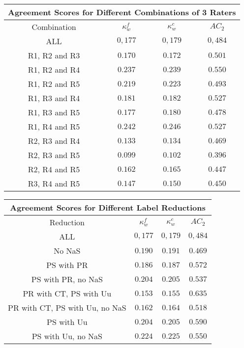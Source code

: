 \begin{minipage}{\linewidth}
\begin{tabular}{|c|c|c|c|}
\hline
\multicolumn{4}{|c|}{Agreement Scores for Different Combinations of 3 Raters}\\\hline
Combination &  $\kappa^{f}_{w}$ & $\kappa^{c}_{w}$ & $AC_2$\\\hline
ALL & $0,177$ & $0,179$ & $0,484$\\\hline
R1, R2 and R3 & $0.170$ & $0.172$ & $0.501$\\\hline
R1, R2 and R4 & $0.237$ & $0.239$ & $0.550$\\\hline
R1, R2 and R5 & $0.219$ & $0.223$ & $0.493$ \\\hline
R1, R3 and R4 & $0.181$ & $0.182$ & $0.527$ \\\hline
R1, R3 and R5 & $0.177$ & $0.180$ & $0.478$ \\\hline
R1, R4 and R5 & $0.242$ & $0.246$ & $0.527$ \\\hline
R2, R3 and R4 & $0.133$ & $0.134$ & $0.469$ \\\hline
R2, R3 and R5 & $0.099$ & $0.102$ & $0.396$ \\\hline
R2, R4 and R5 & $0.162$ & $0.165$ & $0.447$ \\\hline
R3, R4 and R5 & $0.147$ & $0.150$ & $0.450$\\\hline  
\end{tabular}
\end{minipage}
\newline
\newline
\newline
\begin{minipage}{\linewidth}
\begin{tabular}{|c|c|c|c|}
\hline
\multicolumn{4}{|c|}{Agreement Scores for Different Label Reductions}\\\hline
Reduction &  $\kappa^{f}_{w}$ & $\kappa^{c}_{w}$ & $AC_2$\\\hline
ALL & $0,177$ & $0,179$ & $0,484$\\\hline
No NaS & $0.190$ & $0.191$ & $0.469$ \\\hline
PS with PR & $0.186$ & $0.187$ & $0.572$\\\hline
PS with PR, no NaS & $0.204$ & $0.205$ & $0.537$\\\hline
PR with CT, PS with Uu & $0.153$ & $0.155$ & $0.635$\\\hline
PR with CT, PS with Uu, no NaS & $0.162$ & $0.164$ & $0.518$\\\hline
PS with Uu & $0.204$ & $0.205$ & $0.590$\\\hline
PS with Uu, no NaS & $0.224$ & $0.225$ & $0.550$\\\hline 
\end{tabular}
\end{minipage}